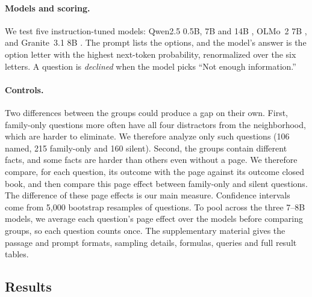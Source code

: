 \documentclass[letterpaper]{article} %
\begin{document}
\paragraph{Models and scoring.}
We test five instruction-tuned models: Qwen2.5 0.5B, 7B and 14B
\citep{qwen2025qwen25}, OLMo~2 7B \citep{olmo2024olmo2}, and Granite~3.1 8B
\citep{granite2024}. The prompt lists the options, and the model's answer is
the option letter with the highest next-token probability, renormalized over
the six letters. A question is \emph{declined} when the model picks ``Not
enough information.''

\paragraph{Controls.}
Two differences between the groups could produce a gap on their own. First,
family-only questions more often have all four distractors from the
neighborhood, which are harder to eliminate. We therefore analyze only such
questions (106 named, 215 family-only and 160 silent).
Second, the groups contain different facts, and some facts are harder than
others even without a page. We therefore compare, for each question, its
outcome with the page against its outcome closed book, and then compare this
page effect between family-only and silent questions. The difference of these
page effects is our main measure. Confidence intervals come from 5,000
bootstrap resamples of questions. To pool across the three 7--8B models, we
average each question's page effect over the models before comparing groups,
so each question counts once. The supplementary material gives the passage
and prompt formats, sampling details, formulas, queries and full result
tables.

\subsection{Results}
\end{document}
